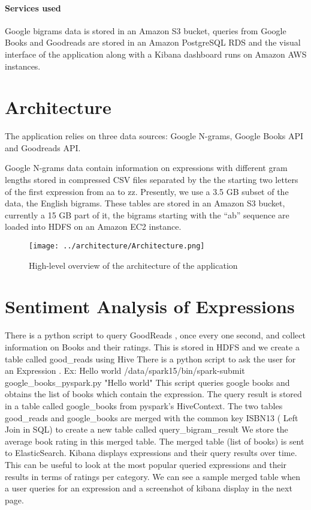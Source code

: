 \documentclass[12pt,letterpaper]{article}
\begin{document}
\paragraph{Services used} Google bigrams data is stored in an Amazon S3 bucket, queries from Google Books and Goodreads are stored in an Amazon PostgreSQL RDS and the visual interface of the application along with a Kibana 
dashboard runs on Amazon AWS instances.

\section{Architecture}

The application relies on three data sources: Google N-grams, Google Books API and Goodreads API. 

Google N-grams data contain information on expressions with different gram lengths stored in compressed CSV files
separated by the the starting two letters of the first expression from aa to zz. Presently, we use a 3.5 GB subset of the data, the English bigrams. These tables are stored in an Amazon S3 bucket, currently
a 15 GB part of it, the bigrams starting with the ``ab'' sequence are loaded into HDFS on an Amazon EC2 instance. 

\begin{figure}[b!]
\texttt{[image: ../architecture/Architecture.png]}
\caption{High-level overview of the architecture of the application}
\end{figure}

\section{Sentiment Analysis of Expressions}

There is a python script to query GoodReads , once every one second, and collect information on Books and their ratings. This is stored in HDFS and we create a table called good_reads using Hive
There is a python script to ask the user for an Expression . Ex: Hello world
/data/spark15/bin/spark-submit google_books_pyspark.py "Hello world"
This script queries google books and obtains the list of books which contain the expression.
The query result is stored in a table called google_books from pyspark’s HiveContext.
The two tables good_reads and google_books are merged with the common key ISBN13 ( Left Join in SQL)  to create a new  table called query_bigram_result
We store the average book rating in this merged table.
The merged table (list of books) is sent to ElasticSearch. 
Kibana displays expressions and  their query results over time. This can be useful to look at the most popular queried expressions and their results in terms of ratings per category.
We can see a sample merged table when a user queries for an expression and a screenshot of kibana display in the next page.
\end{document}
